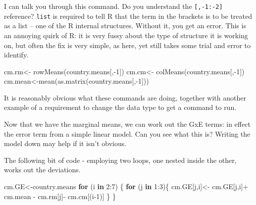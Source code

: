 \documentclass[
]{book}
\newenvironment{Shaded}{\begin{snugshade}}{\end{snugshade}}
\newcommand{\ControlFlowTok}[1]{\textcolor[rgb]{0.13,0.29,0.53}{\textbf{#1}}}
\newcommand{\DecValTok}[1]{\textcolor[rgb]{0.00,0.00,0.81}{#1}}
\newcommand{\FunctionTok}[1]{\textcolor[rgb]{0.00,0.00,0.00}{#1}}
\newcommand{\NormalTok}[1]{#1}
\newcommand{\OtherTok}[1]{\textcolor[rgb]{0.56,0.35,0.01}{#1}}
\newcommand{\SpecialCharTok}[1]{\textcolor[rgb]{0.00,0.00,0.00}{#1}}
\begin{document}
I can talk you through this command. Do you understand the \texttt{{[},-1:-2{]}} reference? \texttt{list} is required to tell R that the term in the brackets is to be treated as a list -- one of the R internal structures. Without it, you get an error. This is an annoying quirk of R: it is very fussy about the type of structure it is working on, but often the fix is very simple, as here, yet still takes some trial and error to identify.

\begin{Shaded}
\begin{Highlighting}[]
\NormalTok{cm.rm}\OtherTok{\textless{}{-}} \FunctionTok{rowMeans}\NormalTok{(country.means[,}\SpecialCharTok{{-}}\DecValTok{1}\NormalTok{])}
\NormalTok{cm.cm}\OtherTok{\textless{}{-}} \FunctionTok{colMeans}\NormalTok{(country.means[,}\SpecialCharTok{{-}}\DecValTok{1}\NormalTok{])}
\NormalTok{cm.mean}\OtherTok{\textless{}{-}}\FunctionTok{mean}\NormalTok{(}\FunctionTok{as.matrix}\NormalTok{(country.means[,}\SpecialCharTok{{-}}\DecValTok{1}\NormalTok{]))}
\end{Highlighting}
\end{Shaded}

It is reasonably obvious what these commands are doing, together with another example of a requirement to change the data type to get a command to run.

Now that we have the marginal means, we can work out the GxE terms: in effect the error term from a simple linear model. Can you see what this is? Writing the model down may help if it isn't obvious.

The following bit of code - employing two loops, one nested inside the other, works out the deviations.

\begin{Shaded}
\begin{Highlighting}[]
\NormalTok{cm.GE}\OtherTok{\textless{}{-}}\NormalTok{country.means}
 \ControlFlowTok{for}\NormalTok{ (i }\ControlFlowTok{in} \DecValTok{2}\SpecialCharTok{:}\DecValTok{7}\NormalTok{) \{}
   \ControlFlowTok{for}\NormalTok{ (j }\ControlFlowTok{in} \DecValTok{1}\SpecialCharTok{:}\DecValTok{3}\NormalTok{)\{ }
\NormalTok{     cm.GE[j,i]}\OtherTok{\textless{}{-}}
\NormalTok{     cm.GE[j,i]}\SpecialCharTok{+}\NormalTok{ cm.mean }\SpecialCharTok{{-}}\NormalTok{ cm.rm[j]}\SpecialCharTok{{-}}\NormalTok{ cm.cm[(i}\DecValTok{{-}1}\NormalTok{)]}
\NormalTok{     \}}
\NormalTok{ \}}
\end{Highlighting}
\end{Shaded}
\end{document}
